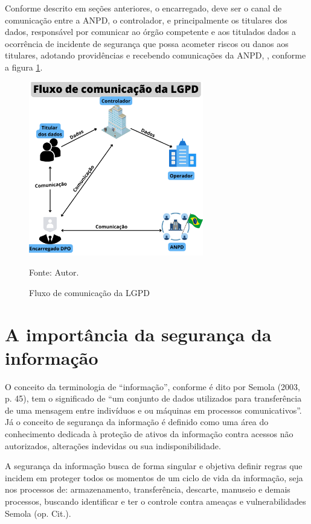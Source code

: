 \documentclass[
	12pt,				%
	openright,			%
	oneside,			%
	a4paper,			%
	english,			%
	french,				%
	spanish,			%
	brazil,				%
	]{abntex2}
\begin{document}
Conforme descrito em seções anteriores, o encarregado, deve ser o canal de comunicação entre a ANPD, o controlador, e principalmente os titulares dos dados, responsável por comunicar ao órgão competente e aos titulados dados a ocorrência de incidente de segurança que possa acometer riscos ou danos aos titulares, adotando providências e recebendo comunicações da ANPD, \cite{LGPD12Mag2020}, conforme a figura \ref{fig: Fluxo }.
\begin{figure}[ht]
    \centering
    \caption{Fluxo de comunicação da LGPD}
    \includegraphics[width=3.0in]{Images/04FluxoLGPD.png}
    
    \label{fig: Fluxo }
    \centering \small Fonte: Autor.
\end{figure}


\section{A importância da segurança da informação }

O conceito da terminologia de “informação”, conforme é dito por Semola (2003, p. 45), tem o significado de “um conjunto de dados utilizados para transferência de uma mensagem entre indivíduos e ou máquinas em processos comunicativos”. Já o conceito de segurança da informação é definido como uma área do conhecimento dedicada à proteção de ativos da informação contra acessos não autorizados, alterações indevidas ou sua indisponibilidade. 

A segurança da informação busca de forma singular e objetiva definir regras que incidem em proteger todos os momentos de um ciclo de vida da informação, seja nos processos de: armazenamento, transferência, descarte, manuseio e demais processos, buscando identificar e ter o controle contra ameaças e vulnerabilidades Semola (op. Cit.).
\end{document}

